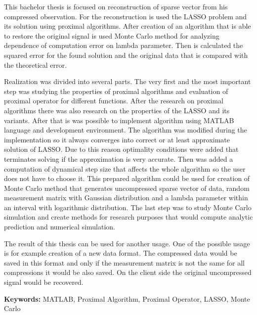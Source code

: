\documentclass[FM,BP]{tulthesis}
\begin{document}
\vspace{2cm}
\begin{abstractEN}
This bachelor thesis is focused on reconstruction of sparse vector from his compressed observation. For the reconstruction is used the LASSO problem and its solution using proximal algorithms. After creation of an algorithm that is able to restore the original signal is used Monte Carlo method for analyzing dependence of computation error on lambda parameter. Then is calculated the squared error for the found solution and the original data that is compared with the theoretical error.


Realization was divided into several parts. The very first and the most important step was studying the properties of proximal algorithms and evaluation of proximal operator for different functions. After the research on proximal algorithms there was also research on the properties of the LASSO and its variants. After that is was possible to implement algorithm using MATLAB language and development environment. The algorithm was modified during the implementation so it always converges into correct or at least approximate solution of LASSO. Due to this reason optimality conditions were added that terminates solving if the approximation is very accurate. Then was added a computation of dynamical step size that affects the whole algorithm so the user does not have to choose it. This prepared algorithm could be used for creation of Monte Carlo method that generates uncompressed sparse vector of data, random measurement matrix with Gaussian distribution and a lambda parameter within an interval with logarithmic distribution. The last step was to study Monte Carlo simulation and create methods for research purposes that would compute analytic prediction and numerical simulation.


The result of this thesis can be used for another usage. One of the possible usage is for example creation of a new data format. The compressed data would be saved in this format and only if the measurement matrix is not the same for all compressions it would be also saved. On the client side the original uncompressed signal would be recovered.


\textbf{Keywords:} MATLAB, Proximal Algorithm, Proximal Operator, LASSO, Monte Carlo
\end{abstractEN}
\clearpage
\tableofcontents

\listoffigures

\newcommand{\listequationsname}{Seznam vzorců}
\newlistof{myequations}{equ}{\listequationsname}
\newcommand{\myequations}[1]{%
	\addcontentsline{equ}{myequations}{\protect\numberline{}#1}\par}
\setlength{\cftmyequationsnumwidth}{0.0em}
\listofmyequations
\end{document}
